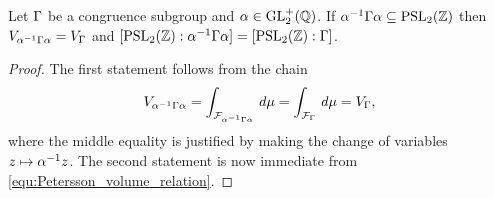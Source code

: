     \begin{lemma}\label{lem:invariance_of_volume}
      Let $\Gamma$ be a congruence subgroup and $\alpha \in \mathrm{GL}_{2}^{+}(\mathbb{Q})$. If $\alpha^{-1}\Gamma\alpha \subseteq \mathrm{PSL}_{2}(\mathbb{Z})$ then $V_{\alpha^{-1}\Gamma\alpha} = V_{\Gamma}$ and $[\mathrm{PSL}_{2}(\mathbb{Z}):\alpha^{-1}\Gamma\alpha] = [\mathrm{PSL}_{2}(\mathbb{Z}):\Gamma]$.
    \end{lemma}
    \begin{proof}
      The first statement follows from the chain
      \[
        V_{\alpha^{-1}\Gamma\alpha} = \int_{\mathcal{F}_{\alpha^{-1}\Gamma\alpha}}\,d\mu = \int_{\mathcal{F}_{\Gamma}}\,d\mu = V_{\Gamma},
      \]
      where the middle equality is justified by making the change of variables $z \mapsto \alpha^{-1}z$. The second statement is now immediate from \cref{equ:Petersson_volume_relation}.
    \end{proof}